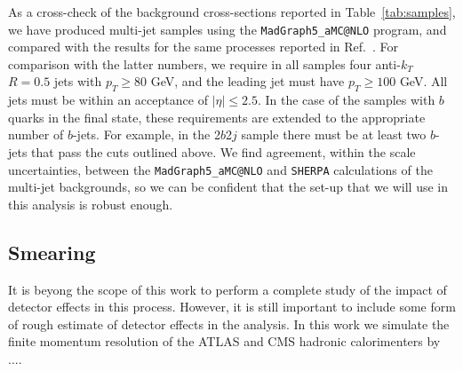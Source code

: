 As a cross-check of the background cross-sections reported in Table~\ref{tab:samples}, we have produced multi-jet samples
using the {\tt MadGraph5\_aMC@NLO} program, and compared with the results for the same processes reported in
Ref.~\cite{Alwall:2014hca}.
%
For comparison with the latter numbers, 
we require in all samples four anti-$k_T$ $R=0.5$ jets with $p_T \ge 80 $ GeV, and the leading jet must have $p_T \ge 100$ GeV.
%
All jets must be within an acceptance of $|\eta| \le 2.5 $.
%
In the case of the samples with $b$ quarks in the final state, these requirements are extended to the appropriate number of $b$-jets. For example, in the 2$b$2$j$ sample there must be at least two $b$-jets that pass the cuts outlined above.
%
We find agreement, within the scale uncertainties, between the {\tt MadGraph5\_aMC@NLO} and {\tt SHERPA} calculations of the multi-jet
backgrounds, so we can be confident that the set-up that we will use in this analysis is robust enough.


\subsection{Smearing}

It is beyong the scope of this work to perform a complete study of the impact of
detector effects in this process.
%
However, it is still important to include some form of rough estimate of detector
effects in the analysis.
%
In this work we simulate the finite momentum resolution of the ATLAS and CMS
hadronic calorimenters by ....
